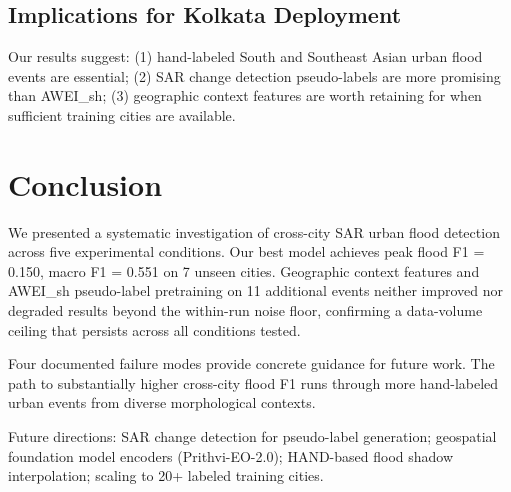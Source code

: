 \documentclass[10pt,twocolumn]{article}
\begin{document}
\subsection{Implications for Kolkata Deployment}

Our results suggest: (1) hand-labeled South and Southeast Asian urban
flood events are essential; (2) SAR change detection pseudo-labels
are more promising than AWEI\_sh; (3) geographic context features
are worth retaining for when sufficient training cities are available.

\section{Conclusion}

We presented a systematic investigation of cross-city SAR urban flood
detection across five experimental conditions.  Our best model achieves
peak flood F1 = 0.150, macro F1 = 0.551 on 7 unseen cities.
Geographic context features and AWEI\_sh pseudo-label pretraining
on 11 additional events neither improved nor degraded results beyond
the within-run noise floor, confirming a data-volume ceiling that
persists across all conditions tested.

Four documented failure modes provide concrete guidance for future work.
The path to substantially higher cross-city flood F1 runs through
more hand-labeled urban events from diverse morphological contexts.

Future directions: SAR change detection for pseudo-label generation;
geospatial foundation model encoders (Prithvi-EO-2.0); HAND-based
flood shadow interpolation; scaling to 20+ labeled training cities.
\end{document}
